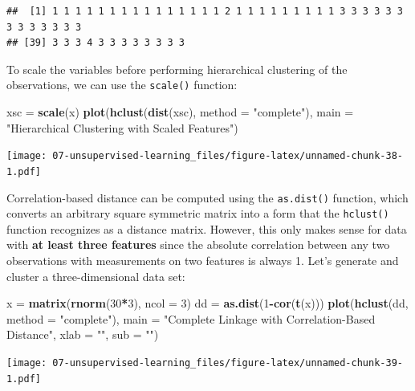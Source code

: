 \documentclass[
  openany]{book}
\newenvironment{Shaded}{\begin{snugshade}}{\end{snugshade}}
\newcommand{\DataTypeTok}[1]{\textcolor[rgb]{0.13,0.29,0.53}{#1}}
\newcommand{\DecValTok}[1]{\textcolor[rgb]{0.00,0.00,0.81}{#1}}
\newcommand{\KeywordTok}[1]{\textcolor[rgb]{0.13,0.29,0.53}{\textbf{#1}}}
\newcommand{\NormalTok}[1]{#1}
\newcommand{\OperatorTok}[1]{\textcolor[rgb]{0.81,0.36,0.00}{\textbf{#1}}}
\newcommand{\StringTok}[1]{\textcolor[rgb]{0.31,0.60,0.02}{#1}}
\begin{document}
\begin{verbatim}
##  [1] 1 1 1 1 1 1 1 1 1 1 1 1 1 1 1 2 1 1 1 1 1 1 1 1 1 3 3 3 3 3 3 3 3 3 3 3 3 3
## [39] 3 3 3 4 3 3 3 3 3 3 3 3
\end{verbatim}

To scale the variables before performing hierarchical clustering of the
observations, we can use the \texttt{scale()} function:

\begin{Shaded}
\begin{Highlighting}[]
\NormalTok{xsc =}\StringTok{ }\KeywordTok{scale}\NormalTok{(x)}
\KeywordTok{plot}\NormalTok{(}\KeywordTok{hclust}\NormalTok{(}\KeywordTok{dist}\NormalTok{(xsc), }\DataTypeTok{method =} \StringTok{"complete"}\NormalTok{), }\DataTypeTok{main =} \StringTok{"Hierarchical Clustering with Scaled Features"}\NormalTok{)}
\end{Highlighting}
\end{Shaded}

\texttt{[image: 07-unsupervised-learning\_files/figure-latex/unnamed-chunk-38-1.pdf]}

Correlation-based distance can be computed using the \texttt{as.dist()} function, which converts an arbitrary square symmetric matrix into a form that
the \texttt{hclust()} function recognizes as a distance matrix. However, this only
makes sense for data with \textbf{at least three features} since the absolute correlation
between any two observations with measurements on two features is
always 1. Let's generate and cluster a three-dimensional data set:

\begin{Shaded}
\begin{Highlighting}[]
\NormalTok{x =}\StringTok{ }\KeywordTok{matrix}\NormalTok{(}\KeywordTok{rnorm}\NormalTok{(}\DecValTok{30}\OperatorTok{*}\DecValTok{3}\NormalTok{), }\DataTypeTok{ncol =} \DecValTok{3}\NormalTok{)}
\NormalTok{dd =}\StringTok{ }\KeywordTok{as.dist}\NormalTok{(}\DecValTok{1}\OperatorTok{-}\KeywordTok{cor}\NormalTok{(}\KeywordTok{t}\NormalTok{(x)))}
\KeywordTok{plot}\NormalTok{(}\KeywordTok{hclust}\NormalTok{(dd, }\DataTypeTok{method =} \StringTok{"complete"}\NormalTok{), }\DataTypeTok{main =} \StringTok{"Complete Linkage with Correlation-Based Distance"}\NormalTok{, }\DataTypeTok{xlab =} \StringTok{""}\NormalTok{, }\DataTypeTok{sub =} \StringTok{""}\NormalTok{)}
\end{Highlighting}
\end{Shaded}

\texttt{[image: 07-unsupervised-learning\_files/figure-latex/unnamed-chunk-39-1.pdf]}
\end{document}
